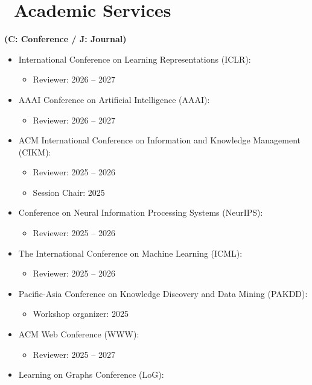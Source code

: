 \documentclass{resume}
\begin{document}
\section{\faPencil\ Academic Services}
\textbf{(C: Conference / J: Journal)}
\begin{itemize}[parsep=0.5ex]
\item [{[C11]}] International Conference on Learning Representations (ICLR):
\begin{itemize}
    \item Reviewer: 2026 -- 2027
\end{itemize}
\item [{[C10]}] AAAI Conference on Artificial Intelligence (AAAI): 
\begin{itemize}
    \item Reviewer: 2026 -- 2027
\end{itemize}
\item [{[C9]}] ACM International Conference on Information and Knowledge Management (CIKM): 
\begin{itemize}
    \item Reviewer: 2025 -- 2026
    \item Session Chair: 2025
\end{itemize}
\item [{[C8]}] Conference on Neural Information Processing Systems (NeurIPS): 
\begin{itemize}
    \item Reviewer: 2025 -- 2026
\end{itemize}
\item [{[C7]}] The International Conference on Machine Learning (ICML): 
\begin{itemize}
    \item Reviewer: 2025 -- 2026
\end{itemize}
\item [{[C6]}] Pacific-Asia Conference on Knowledge Discovery and Data Mining (PAKDD): 
\begin{itemize}
    \item Workshop organizer: 2025
\end{itemize}
\item [{[C5]}] ACM Web Conference (WWW): 
\begin{itemize}
    \item Reviewer: 2025 -- 2027
\end{itemize}
\item [{[C4]}] Learning on Graphs Conference (LoG): 
\begin{itemize}

\end{itemize}
\end{itemize}
\end{document}
